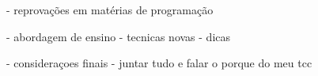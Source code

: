 - reprovações em matérias de programação

- abordagem de ensino
	- tecnicas novas
	- dicas
	
- consideraçoes finais 
	- juntar tudo e falar o porque do meu tcc

